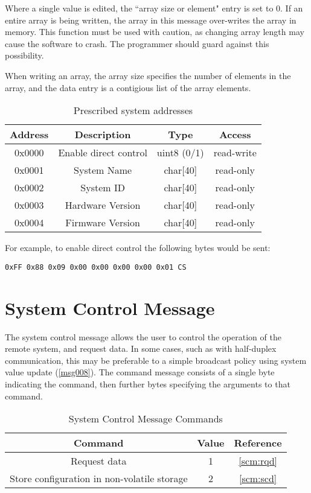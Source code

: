 Where a single value is edited, the ``array size or element" entry is set to 0. If an entire array is being written, the array in this message over-writes the array in memory. This function must be used with caution, as changing array length may cause the software to crash. The programmer should guard against this possibility.

When writing an array, the array size specifies the number of elements in the array, and the data entry is a contigious list of the array elements.

\begin{table}[H]
  \centering
  \begin{tabular}{ c c c c }
  Address & Description & Type & Access\\
\hline
  0x0000   & Enable direct control & uint8 (0/1) & read-write \\
  0x0001   & System Name & char[40] & read-only \\
  0x0002   & System ID   & char[40] & read-only \\
  0x0003   & Hardware Version & char[40] & read-only \\
  0x0004   & Firmware Version & char[40] & read-only \\
  \end{tabular}
  \caption{Prescribed system addresses}
  \label{tab:svu:prescribed}
\end{table}

For example, to enable direct control the following bytes would be sent:
\begin{verbatim}
0xFF 0x88 0x09 0x00 0x00 0x00 0x00 0x01 CS
\end{verbatim}

\section{System Control Message}
\label{msg009}

The system control message allows the user to control the operation of the remote system, and request data. In some cases, such as with half-duplex communication, this may be preferable to a simple broadcast policy using system value update (\ref{msg008}). The command message consists of a single byte indicating the command, then further bytes specifying the arguments to that command.

\begin{table}[H]
  \centering
  \begin{tabular}{ c c c }
    Command              & Value & Reference \\
\hline
    Request data          & 1 & \ref{scm:rqd} \\
    Store configuration in non-volatile storage  & 2 & \ref{scm:scd}\\
  \end{tabular}
  \caption{System Control Message Commands}
  \label{tab:scm:commands}
\end{table}

